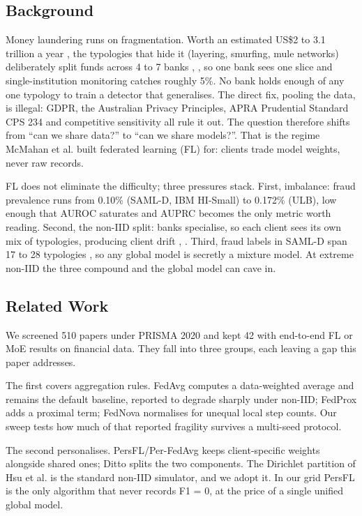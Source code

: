 \documentclass[a4paper, 10pt, conference]{ieeeconf}
\begin{document}
\subsection{Background}
Money laundering runs on fragmentation. Worth an estimated US\$2 to 3.1 trillion
a year \cite{r1}, the typologies that hide it (layering, smurfing, mule
networks) deliberately split funds across 4 to 7 banks \cite{r2}, \cite{r3}, so
one bank sees one slice and single-institution monitoring catches roughly 5\%.
No bank holds enough of any one typology to train a detector that generalises.
The direct fix, pooling the data, is illegal: GDPR, the Australian Privacy
Principles, APRA Prudential Standard CPS 234 \cite{r4} and competitive
sensitivity all rule it out. The question therefore shifts from ``can we share
data?'' to ``can we share models?''. That is the regime McMahan et al. \cite{r5}
built federated learning (FL) for: clients trade model weights, never raw
records.

FL does not eliminate the difficulty; three pressures stack. First, imbalance:
fraud prevalence runs from 0.10\% (SAML-D, IBM HI-Small) to 0.172\% (ULB), low
enough that AUROC saturates and AUPRC becomes the only metric worth reading.
Second, the non-IID split: banks specialise, so each client sees its own mix of
typologies, producing client drift \cite{r6}, \cite{r7}. Third, fraud labels in
SAML-D span 17 to 28 typologies \cite{r2}, so any global model is secretly a
mixture model. At extreme non-IID the three compound and the global model can
cave in.

\subsection{Related Work}
We screened 510 papers under PRISMA 2020 \cite{r8} and kept 42 with end-to-end
FL or MoE results on financial data. They fall into three groups, each leaving a
gap this paper addresses.

The first covers aggregation rules. FedAvg \cite{r5} computes a data-weighted
average and remains the default baseline, reported to degrade sharply under
non-IID; FedProx \cite{r9} adds a proximal term; FedNova \cite{r10} normalises
for unequal local step counts. Our sweep tests how much of that reported
fragility survives a multi-seed protocol.

The second personalises. PersFL/Per-FedAvg \cite{r11} keeps client-specific
weights alongside shared ones; Ditto \cite{r12} splits the two components. The
Dirichlet partition of Hsu et al. \cite{r13} is the standard non-IID simulator,
and we adopt it. In our grid PersFL is the only algorithm that never records
F1 = 0, at the price of a single unified global model.
\end{document}
